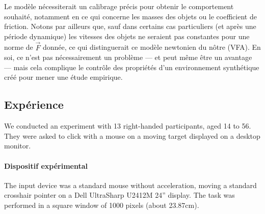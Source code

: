     
    Le modèle nécessiterait un calibrage précis pour obtenir le comportement souhaité, notamment en ce qui concerne les masses des objets ou le coefficient de friction. Notons par ailleurs que, sauf dans certains cas particuliers (et après une période dynamique) les vitesses des objets ne seraient pas constantes pour une norme de $\vec{F}$ donnée, ce qui distinguerait ce modèle newtonien du nôtre (VFA). En soi, ce n'est pas nécessairement un problème --- et peut même être un avantage --- mais cela complique le contrôle des propriétés d'un environnement synthétique créé pour mener une étude empirique.

\subsection{Expérience}
We conducted an experiment with 13 right-handed participants, aged 14 to 56. They were asked to click with a mouse on a moving target displayed on a desktop monitor.

\paragraph{Dispositif expérimental}
The input device was a standard mouse without acceleration, moving a
standard crosshair pointer on a Dell UltraSharp U2412M 24” display. The task was
performed in a square window of 1000 pixels (about 23.87cm).

